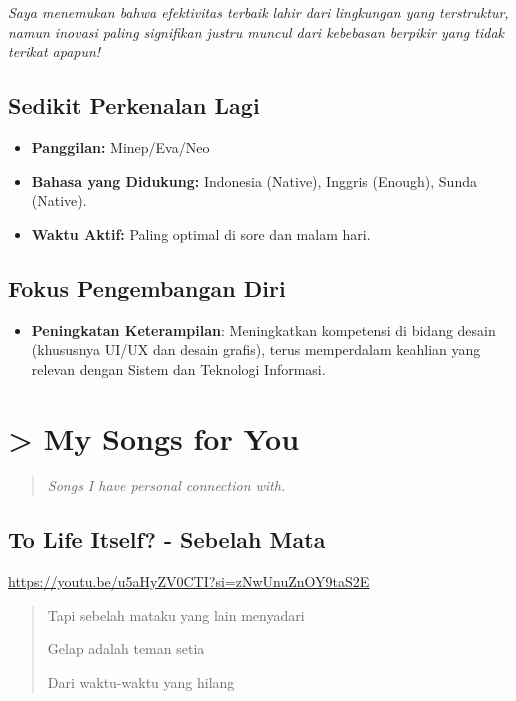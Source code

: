 \documentclass[
  letterpaper,
  DIV=11,
  numbers=noendperiod]{scrreprt}
\providecommand{\tightlist}{%
  \setlength{\itemsep}{0pt}\setlength{\parskip}{0pt}}
\begin{document}
\emph{Saya menemukan bahwa efektivitas terbaik lahir dari lingkungan
yang terstruktur, namun inovasi paling signifikan justru muncul dari
kebebasan berpikir yang tidak terikat apapun!}

\section{Sedikit Perkenalan Lagi}\label{sedikit-perkenalan-lagi}

\begin{itemize}
\tightlist
\item
  \textbf{Panggilan:} Minep/Eva/Neo
\item
  \textbf{Bahasa yang Didukung:} Indonesia (Native), Inggris (Enough),
  Sunda (Native).
\item
  \textbf{Waktu Aktif:} Paling optimal di sore dan malam hari.
\end{itemize}

\section{Fokus Pengembangan Diri}\label{fokus-pengembangan-diri}

\begin{itemize}
\tightlist
\item
  \textbf{Peningkatan Keterampilan}: Meningkatkan kompetensi di bidang
  desain (khususnya UI/UX dan desain grafis), terus memperdalam keahlian
  yang relevan dengan Sistem dan Teknologi Informasi.
\end{itemize}


\chapter{\textgreater{} My Songs for You}\label{my-songs-for-you}

\begin{quote}
\emph{Songs I have personal connection with.}
\end{quote}

\section{To Life Itself? - Sebelah
Mata}\label{to-life-itself---sebelah-mata}

\url{https://youtu.be/u5aHyZV0CTI?si=zNwUnuZnOY9taS2E}

\begin{quote}
Tapi sebelah mataku yang lain menyadari

Gelap adalah teman setia

Dari waktu-waktu yang hilang
\end{quote}
\end{document}
